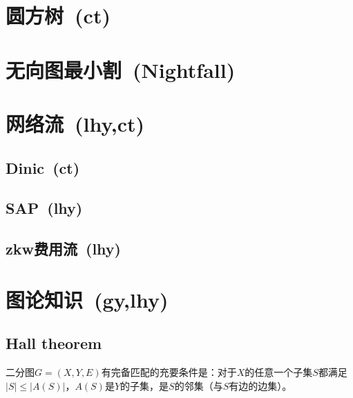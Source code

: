 \section{圆方树\ \small(ct)}
\section{无向图最小割\ \small(Nightfall)}
\section{网络流\ \small(lhy,ct)}
    \subsection*{Dinic\ \small(ct)}
    \subsection*{SAP\ \small(lhy)}
    \subsection*{zkw费用流\ \small(lhy)}
\section{图论知识\ \small(gy,lhy)}
    \subsection*{Hall theorem}
        二分图$ G = (X, Y, E) $有完备匹配的充要条件是：对于$ X $的任意一个子集$ S $都满足$ \left| S \right| \leq \left| A(S) \right| $，$ A(S) $是$ Y $的子集，是$ S $的邻集（与$ S $有边的边集）。
